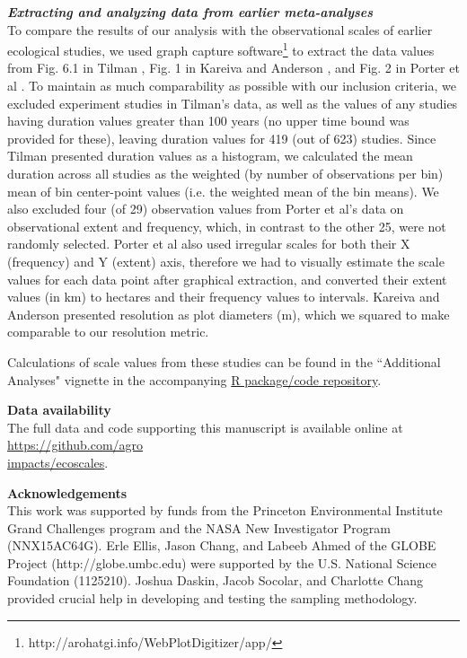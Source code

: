 \documentclass[12pt]{article}
\begin{document}
\vspace{5pt}
\noindent \textbf{\emph{Extracting and analyzing data from earlier meta-analyses}}\\
To compare the results of our analysis with the observational scales of earlier ecological studies, we used graph capture software\footnote{http://arohatgi.info/WebPlotDigitizer/app/} to extract the data values from Fig. 6.1 in Tilman \cite{tilman_ecological_1989}, Fig. 1 in Kareiva and Anderson \cite{kareiva_spatial_1988}, and Fig. 2 in Porter et al \cite{porter_crop_2005}. To maintain as much comparability as possible with our inclusion criteria, we excluded experiment studies in Tilman's data, as well as the values of any studies having duration values greater than 100 years (no upper time bound was provided for these), leaving duration values for 419 (out of 623) studies. Since Tilman presented duration values as a histogram, we calculated the mean duration across all studies as the weighted (by number of observations per bin) mean of bin center-point values (i.e. the weighted mean of the bin means).  We also excluded four (of 29) observation values from Porter et al's data on observational extent and frequency, which, in contrast to the other 25, were not randomly selected. Porter et al also used irregular scales for both their X (frequency) and Y (extent) axis, therefore we had to visually estimate the scale values for each data point after graphical extraction, and converted their extent values (in km) to hectares and their frequency values to intervals. Kareiva and Anderson presented resolution as plot diameters (m), which we squared to make comparable to our resolution metric.  

Calculations of scale values from these studies can be found in the ``Additional Analyses" vignette in the accompanying \href{https://github.com/agroimpacts/ecoscales}{R package/code repository}.


\vspace{10pt}
\noindent \textbf{Data availability}
\vspace{5pt}
\\
The full data and code supporting this manuscript is available online at \href{https://github.com/agroimpacts/ecoscales}{https://github.com/agro\\impacts/ecoscales}.

\vspace{10pt}
\noindent \textbf{Acknowledgements} 
\vspace{5pt}
\\
This work was supported by funds from the Princeton Environmental Institute Grand Challenges program and the NASA New Investigator Program (NNX15AC64G). Erle Ellis, Jason Chang, and Labeeb Ahmed of the GLOBE Project (http://globe.umbc.edu) were supported by the U.S. National Science Foundation (1125210). Joshua Daskin, Jacob Socolar, and Charlotte Chang provided crucial help in developing and testing the sampling methodology. 
\end{document}
